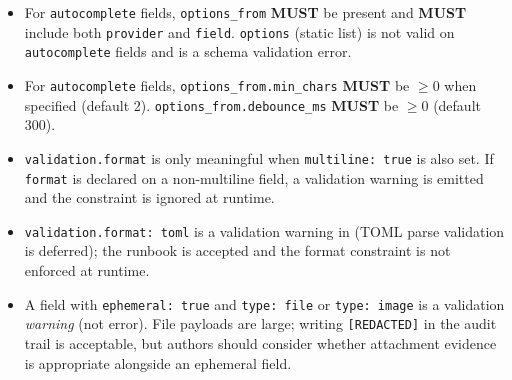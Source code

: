 \begin{itemize}
        silently ignored when \texttt{validation.pattern} is absent
        (warning, not error).
  \item For \texttt{autocomplete} fields, \texttt{options\_from} \textbf{MUST}
        be present and \textbf{MUST} include both \texttt{provider} and
        \texttt{field}.  \texttt{options} (static list) is not valid on
        \texttt{autocomplete} fields and is a schema validation error.
  \item For \texttt{autocomplete} fields, \texttt{options\_from.min\_chars}
        \textbf{MUST} be $\geq 0$ when specified (default 2).
        \texttt{options\_from.debounce\_ms} \textbf{MUST} be $\geq 0$ (default 300).
  \item \texttt{validation.format} is only meaningful when \texttt{multiline:
        true} is also set.  If \texttt{format} is declared on a
        non-multiline field, a validation warning is emitted and the
        constraint is ignored at runtime.
  \item \texttt{validation.format: toml} is a validation warning in 
        (TOML parse validation is deferred); the runbook is accepted and the
        format constraint is not enforced at runtime.
  \item A field with \texttt{ephemeral: true} and \texttt{type: file} or
        \texttt{type: image} is a validation \emph{warning} (not error).
        File payloads are large; writing \texttt{[REDACTED]} in the audit
        trail is acceptable, but authors should consider whether attachment
        evidence is appropriate alongside an ephemeral field.
\end{itemize}

